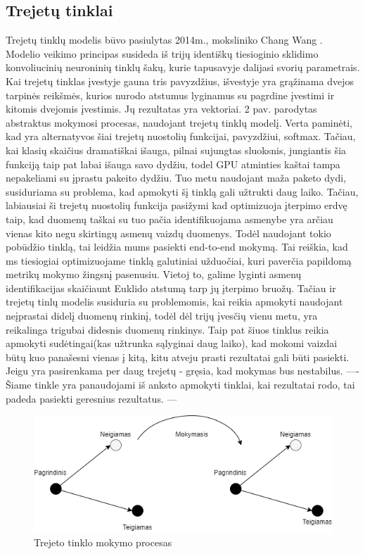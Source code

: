 \documentclass{VUMIFPSkursinis}
\DeclareRobustCommand{\[}{\begin{equation}}
\DeclareRobustCommand{\]}{\end{equation}}
\begin{document}
\subsection{Trejetų tinklai}
Trejetų tinklų modelis būvo pasiulytas 2014m., moksliniko Chang Wang \cite{Learning_fine_grained_image}. Modelio veikimo principas susideda iš trijų identiškų tiesioginio sklidimo konvoliucinių neuroninių tinklų šakų, kurie tapusavyje dalijasi svorių parametrais. Kai trejetų tinklas įvestyje gauna tris pavyzdžius, išvestyje yra grąžinama dvejos tarpinės reikšmės, kurios nurodo atstumus lyginamus su pagrdine įvestimi ir kitomis dvejomis įvestimis. Jų rezultatas yra vektoriai. 2 pav. parodytas abstraktus mokymosi procesas, naudojant trejetų tinklų modelį. Verta paminėti, kad yra alternatyvos šiai trejetų nuostolių funkcijai, pavyzdžiui, softmax. Tačiau, kai klasių skaičius dramatiškai išauga, pilnai sujungtas sluoksnis, jungiantis šia funkciją taip pat labai išauga savo dydžiu, todel GPU atminties kaštai tampa nepakeliami su įprastu pakeito dydžiu. Tuo metu naudojant maža paketo dydi, susiduriama su problema, kad apmokyti šį tinklą gali užtrukti daug laiko. Tačiau, labiausiai ši trejetų nuostolių funkcija pasižymi kad  optimizuoja įterpimo erdvę taip, kad duomenų taškai su tuo pačia identifikuojama asmenybe yra arčiau vienas kito negu skirtingų asmenų vaizdų duomenys. Todėl naudojant tokio pobūdžio tinklą, tai leidžia mums pasiekti end-to-end mokymą. Tai reiškia, kad ms tiesiogiai optimizuojame tinklą galutiniai užduočiai, kuri paverčia papildomą metrikų mokymo žingsnį pasenusiu. Vietoj to, galime lyginti asmenų identifikacijas skaičiaunt Euklido atstumą tarp jų įterpimo bruožų. Tačiau ir trejetų tinlų modelis susiduria su problemomis, kai reikia apmokyti naudojant neįprastai didelį duomenų rinkinį, todėl dėl trijų įvesčių vienu metu, yra reikalinga trigubai didesnis duomenų rinkinys. Taip pat šiuos tinklus reikia apmokyti sudėtingai(kas užtrunka sąlyginai daug laiko), kad mokomi vaizdai būtų kuo panašesni vienas į kitą, kitu atveju prasti rezultatai gali būti pasiekti. Jeigu yra pasirenkama per daug trejetų - gręsia, kad mokymas bus nestabilus.
----
Šiame tinkle yra panaudojami iš anksto apmokyti tinklai, kai rezultatai rodo, tai padeda pasiekti geresnius rezultatus.
---
\begin{figure}[H]
\centering
\includegraphics[scale=0.5]{img/Triplet_network}
\caption{Trejeto tinklo mokymo procesas \cite{Improved_triplet_network}} %
\label{img:mlp}
\end{figure}
\pagebreak
\end{document}
